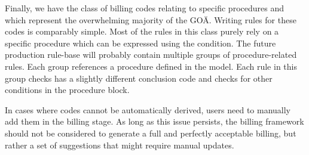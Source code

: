 Finally, we have the class of billing codes relating to specific procedures and which represent the overwhelming majority of the GOÄ.
Writing rules for these codes is comparably simple.
Most of the rules in this class purely rely on a specific procedure which can be expressed using the \requiredProcedure condition.
The future production rule-base will probably contain multiple groups of procedure-related rules.
Each group references a procedure defined in the \AV model.
Each rule in this group checks has a slightly different conclusion code and checks for other conditions in the procedure block.


In cases where codes cannot be automatically derived, users need to manually add them in the billing stage.
As long as this issue persists, the billing framework should not be considered to generate a full and perfectly acceptable billing,
but rather a set of suggestions that might require manual updates.





